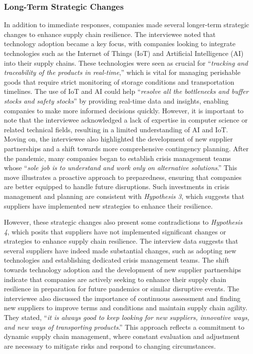 \subsubsection{Long-Term Strategic Changes}

In addition to immediate responses, companies made several longer-term strategic changes to enhance supply chain resilience. The interviewee noted that technology adoption became a key focus, with companies looking to integrate technologies such as the Internet of Things (IoT) and Artificial Intelligence (AI) into their supply chains. These technologies were seen as crucial for “\textit{tracking and traceability of the products in real-time},” which is vital for managing perishable goods that require strict monitoring of storage conditions and transportation timelines. The use of IoT and AI could help “\textit{resolve all the bottlenecks and buffer stocks and safety stocks}” by providing real-time data and insights, enabling companies to make more informed decisions quickly. However, it is important to note that the interviewee acknowledged a lack of expertise in computer science or related technical fields, resulting in a limited understanding of AI and IoT. Moving on, the interviewee also highlighted the development of new supplier partnerships and a shift towards more comprehensive contingency planning. After the pandemic, many companies began to establish crisis management teams whose “\textit{sole job is to understand and work only on alternative solutions}.” This move illustrates a proactive approach to preparedness, ensuring that companies are better equipped to handle future disruptions. Such investments in crisis management and planning are consistent with \textit{Hypothesis 3}, which suggests that suppliers have implemented new strategies to enhance their resilience.

However, these strategic changes also present some contradictions to \textit{Hypothesis 4}, which posits that suppliers have not implemented significant changes or strategies to enhance supply chain resilience. The interview data suggests that several suppliers have indeed made substantial changes, such as adopting new technologies and establishing dedicated crisis management teams. The shift towards technology adoption and the development of new supplier partnerships indicate that companies are actively seeking to enhance their supply chain resilience in preparation for future pandemics or similar disruptive events. The interviewee also discussed the importance of continuous assessment and finding new suppliers to improve terms and conditions and maintain supply chain agility. They stated, “\textit{it is always good to keep looking for new suppliers, innovative ways, and new ways of transporting products}.” This approach reflects a commitment to dynamic supply chain management, where constant evaluation and adjustment are necessary to mitigate risks and respond to changing circumstances.

